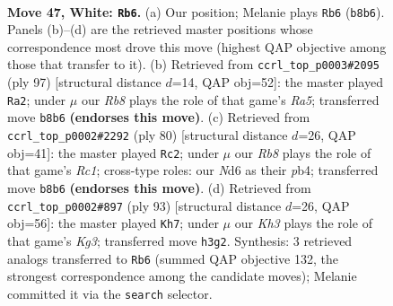 \documentclass[11pt]{article}
\begin{document}
\clearpage

\begin{figure}[p]\centering
\begin{subfigure}{0.46\textwidth}\centering
\resizebox{\linewidth}{!}{%
\newchessgame
\chessboard[
  setfen={1R6/6pk/3Npp2/7p/1p1P1P1P/1r2P1PK/8/8 w - - 2 47},
  showmover=false,
  pgfstyle=straightmove, color=movearrow, markmove={b8-b6}
]}
\caption{}
\end{subfigure}\hfill
\begin{subfigure}{0.46\textwidth}\centering
\resizebox{\linewidth}{!}{%
\newchessgame
\chessboard[
  setfen={R7/P5kp/3p2p1/4p3/r3Pp1P/5P2/6PK/8 b - - 1 49},
  showmover=false,
  pgfstyle=straightmove, color=movearrow, markmove={a4-a2}
]}
\caption{}
\end{subfigure}
\\[4pt]
\begin{subfigure}{0.46\textwidth}\centering
\resizebox{\linewidth}{!}{%
\newchessgame
\chessboard[
  setfen={8/p7/2r1k3/2p1p2p/1p2P1p1/1P1PK1P1/P6P/2R5 w - - 10 41},
  showmover=false,
  pgfstyle=straightmove, color=movearrow, markmove={c1-c2}
]}
\caption{}
\end{subfigure}\hfill
\begin{subfigure}{0.46\textwidth}\centering
\resizebox{\linewidth}{!}{%
\newchessgame
\chessboard[
  setfen={8/R5p1/P4pkp/4p3/4P1P1/5P1K/r7/8 b - - 14 47},
  showmover=false,
  pgfstyle=straightmove, color=movearrow, markmove={g6-h7}
]}
\caption{}
\end{subfigure}
\caption{\textbf{Move 47, White: \texttt{Rb6}.} (a) Our position; Melanie plays \texttt{Rb6} (\texttt{b8b6}). Panels (b)--(d) are the retrieved master positions whose correspondence most drove this move (highest QAP objective among those that transfer to it). (b) Retrieved from \texttt{ccrl\_top\_p0003\#2095} (ply 97) [structural distance $d$=14, QAP obj=52]: the master played \texttt{Ra2}; under $\mu$ our \emph{Rb8} plays the role of that game's \emph{Ra5}; transferred move \texttt{b8b6} \textbf{(endorses this move)}. (c) Retrieved from \texttt{ccrl\_top\_p0002\#2292} (ply 80) [structural distance $d$=26, QAP obj=41]: the master played \texttt{Rc2}; under $\mu$ our \emph{Rb8} plays the role of that game's \emph{Rc1}; cross-type roles: our \emph{N}d6 as their \emph{p}b4; transferred move \texttt{b8b6} \textbf{(endorses this move)}. (d) Retrieved from \texttt{ccrl\_top\_p0002\#897} (ply 93) [structural distance $d$=26, QAP obj=56]: the master played \texttt{Kh7}; under $\mu$ our \emph{Kh3} plays the role of that game's \emph{Kg3}; transferred move \texttt{h3g2}. Synthesis: 3 retrieved analogs transferred to \texttt{Rb6} (summed QAP objective 132, the strongest correspondence among the candidate moves); Melanie committed it via the \texttt{search} selector.}
\label{fig:thought-m92}
\end{figure}
\end{document}
